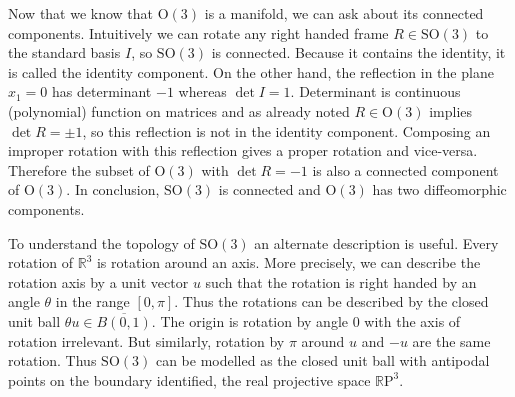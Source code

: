 \documentclass[twoside,11pt,a4paper,leqno]{article}
\numberwithin{equation}{section}
\theoremstyle{plain}
\theoremstyle{definition}
\newcommand{\bbR}{\mathbb{R}}
\newcommand{\RP}{\mathbb{R}\mathrm{P}}
\renewcommand{\O}{\mathrm{O}}
\newcommand{\SO}{\mathrm{SO}}
\begin{document}
Now that we know that $\O(3)$ is a manifold, we can ask about its connected components.
Intuitively we can rotate any right handed frame $R \in \SO(3)$ to the standard basis $I$, so $\SO(3)$ is connected.
Because it contains the identity, it is called the identity component.
On the other hand, the reflection in the plane $x_1 = 0$ has determinant $-1$ whereas $\det I = 1$.
Determinant is continuous (polynomial) function on matrices and as already noted $R \in \O(3)$ implies $\det R = \pm 1$, so this reflection is not in the identity component.
Composing an improper rotation with this reflection gives a proper rotation and vice-versa. Therefore the subset of $\O(3)$ with $\det R = -1$ is also a connected component of $\O(3)$.
In conclusion, $\SO(3)$ is connected and $\O(3)$ has two diffeomorphic components.

To understand the topology of $\SO(3)$ an alternate description is useful.
Every rotation of $\bbR^3$ is rotation around an axis.
More precisely, we can describe the rotation axis by a unit vector $u$ such that the rotation is right handed by an angle $\theta$ in the range $[0,\pi]$.
Thus the rotations can be described by the closed unit ball $\theta u \in \overline{B(0,1)}$.
The origin is rotation by angle $0$ with the axis of rotation irrelevant.
But similarly, rotation by $\pi$ around $u$ and $-u$ are the same rotation.
Thus $\SO(3)$ can be modelled as the closed unit ball with antipodal points on the boundary identified, the real projective space $\RP^3$.
\end{document}
